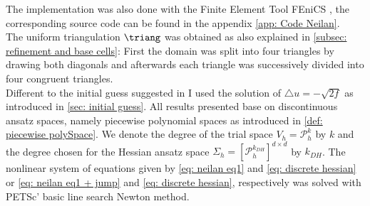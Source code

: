The implementation was also done with the Finite Element Tool FEniCS \cite{FEniCS}, the corresponding source code can be found in the appendix \ref{app: Code Neilan}. \\
The uniform triangulation $\triang$ was obtained as also explained in \ref{subsec: refinement and base cells}: First the domain was split into four triangles by drawing both diagonals and afterwards each triangle was successively divided into four congruent triangles. \\
Different to the initial guess suggested in \cite{Neilan2014} I used the solution of $\triangle u = -\sqrt{2f}$ as introduced in \ref{sec: initial guess}. All results presented base on discontinuous ansatz spaces, namely piecewise polynomial spaces as introduced in \ref{def: piecewise polySpace}.
We denote the degree of the trial space $V_h=\mathcal P_h^k$ by $k$ and the degree chosen for the Hessian ansatz space $\Sigma_h = [\mathcal{P}_h^{k_{DH}}]^{d \times d}$ by $k_{DH}$. The nonlinear system of equations given by \eqref{eq: neilan eq1} and \eqref{eq: discrete hessian} or \eqref{eq: neilan eq1 + jump} and \eqref{eq: discrete hessian}, respectively was solved with PETSc' basic line search Newton method. 

